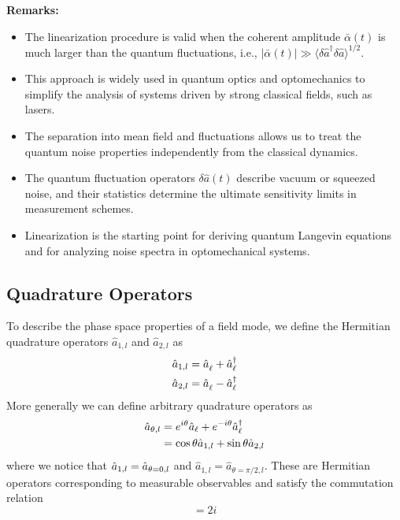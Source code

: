 \textbf{Remarks:} 
\begin{itemize}
  \item The linearization procedure is valid when the coherent amplitude $\bar{\alpha}(t)$ is much larger than the quantum fluctuations, i.e., $|\bar{\alpha}(t)| \gg \langle \delta\hat{a}^\dagger \delta\hat{a} \rangle^{1/2}$.
  \item This approach is widely used in quantum optics and optomechanics to simplify the analysis of systems driven by strong classical fields, such as lasers.
  \item The separation into mean field and fluctuations allows us to treat the quantum noise properties independently from the classical dynamics.
  \item The quantum fluctuation operators $\delta\hat{a}(t)$ describe vacuum or squeezed noise, and their statistics determine the ultimate sensitivity limits in measurement schemes.
  \item Linearization is the starting point for deriving quantum Langevin equations and for analyzing noise spectra in optomechanical systems.
\end{itemize}
\subsection*{Quadrature Operators}

To describe the phase space properties of a field mode, we define the Hermitian quadrature operators $\hat{a}_{1,l}$ and $\hat{a}_{2,l}$ as
\begin{equation}
  \begin{split}
    \hat{a}_{1,l} &= \hat{a}^{\vphantom{\dagger}}_{\ell} + \hat{a}_{\ell}^\dagger  \\
    \hat{a}_{2,l} &= \hat{a}^{\vphantom{\dagger}}_{\ell} - \hat{a}_{\ell}^\dagger
  \end{split}
\end{equation}
More generally we can define arbitrary quadrature operators as 
\begin{align}
  \hat{a}_{\theta,l} &= e^{i\theta}\hat{a}_{\ell}+ e^{-i\theta}\hat{a}_{\ell}^{\dagger} \notag \\ 
  & = \cos \theta \hat{a}_{1,l} + \sin \theta \hat{a}_{2,l}
\end{align}
where we notice that $\hat{a}_{1,l} = \hat{a}_{\theta=0\vphantom{\pi/2},l}$ and $\hat{a}_{1,l} = \hat{a}_{\theta=\pi/2,l}$. These are Hermitian operators corresponding to measurable observables and satisfy the commutation relation
\begin{equation}
[a_{\theta \vphantom{\pi/2},l}, a_{\theta+\pi/2,l}] = 2i
\end{equation}

